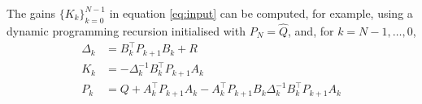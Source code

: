 \documentclass[a4paper, 10 pt, conference]{IEEEconf}
\begin{document}
The gains $\{K_k\}_{k=0}^{N-1}$ in equation \eqref{eq:input} can be computed, for example, using a dynamic programming recursion initialised with $P_N = \hat{Q}$, and, for $k=N-1, \dots , 0$, 
%
\begin{equation}\label{eq:dp}
\begin{aligned}
\Delta_k &= B_k^\top P_{k+1} B_k + R
\\
K_k &= -\Delta_k^{-1} B_k^\top P_{k+1} A_k
\\
P_k &= Q + A_k^\top P_{k+1} A_k - A_k^\top P_{k+1}B_k \Delta_k^{-1} B_k^\top P_{k+1} A_k
\end{aligned}
\end{equation}
\end{document}

